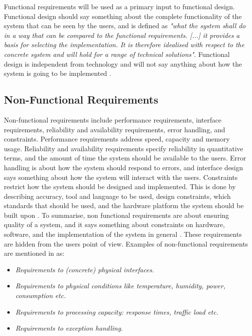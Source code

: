 Functional requirements will be used as a primary input to functional design. Functional design should say something about the complete functionality of the system that can be seen by the users, and is defined as \emph{"what the system shall do in a way that can be compared to the functional requirements. [...] it provides a basis for selecting the implementation. It is therefore idealised with respect to the concrete system and will hold for a range of technical solutions"}. Functional design is independent from technology and will not say anything about how the system is going to be implemented \cite{systemutviklingDel1}. 

\subsection{Non-Functional Requirements}
Non-functional requirements include performance requirements, interface requirements, reliability and availability requirements, error handling, and constraints. Performance requirements address speed, capacity and memory usage. Reliability and availability requirements specify reliability in quantitative terms, and the amount of time the system should be available to the users. Error handling is about how the system should respond to errors, and interface design says something about how the system will interact with the users. Constraints restrict how the system should be designed and implemented. This is done by describing accuracy, tool and language to be used, design constraints, which standards that should be used, and the hardware platform the system should be built upon \cite{braude2000software}. To summarise, non functional requirements are about ensuring quality of a system, and it says something about constraints on hardware, software, and the implementation of the system in general \cite{mmi}. These requirements are hidden from the users point of view. Examples of non-functional requirements are mentioned in \cite{systemutviklingDel1} as:
\begin{itemize}
\item \emph{Requirements to (concrete) physical interfaces.}
\item \emph{Requirements to physical conditions like temperature, humidity, power, consumption etc.}
\item \emph{Requirements to processing capacity: response times, traffic load etc.}
\item \emph{Requirements to exception handling.} \\ \\ 
\end{itemize}   

